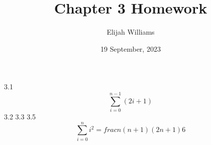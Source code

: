 \documentclass{article}
\title{Chapter 3 Homework}
\author{Elijah Williams}
\date{19 September, 2023}
\begin{document}
\maketitle
\newpage
{\Huge 3.1}    
\[ \sum_{i=0}^{n-1} (2i+1) \]
{\Huge 3.2}
\newline
{\Huge 3.3}
\newline
{\Huge 3.5}          
\[ \sum_{i=0}^{n} i^2 = frac{n(n+1)(2n+1)}{6} \]
\end{document}
